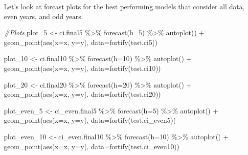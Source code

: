 \documentclass[
]{article}
\newenvironment{Shaded}{\begin{snugshade}}{\end{snugshade}}
\newcommand{\AttributeTok}[1]{\textcolor[rgb]{0.77,0.63,0.00}{#1}}
\newcommand{\CommentTok}[1]{\textcolor[rgb]{0.56,0.35,0.01}{\textit{#1}}}
\newcommand{\DecValTok}[1]{\textcolor[rgb]{0.00,0.00,0.81}{#1}}
\newcommand{\FunctionTok}[1]{\textcolor[rgb]{0.00,0.00,0.00}{#1}}
\newcommand{\NormalTok}[1]{#1}
\newcommand{\OtherTok}[1]{\textcolor[rgb]{0.56,0.35,0.01}{#1}}
\newcommand{\SpecialCharTok}[1]{\textcolor[rgb]{0.00,0.00,0.00}{#1}}
\begin{document}
Let's look at forcast plots for the best performing models that consider
all data, even years, and odd years.

\begin{Shaded}
\begin{Highlighting}[]
\CommentTok{\#Plots}
\NormalTok{plot\_5 }\OtherTok{\textless{}{-}}\NormalTok{ ci.final5 }\SpecialCharTok{\%\textgreater{}\%}
  \FunctionTok{forecast}\NormalTok{(}\AttributeTok{h=}\DecValTok{5}\NormalTok{) }\SpecialCharTok{\%\textgreater{}\%}
  \FunctionTok{autoplot}\NormalTok{() }\SpecialCharTok{+} \FunctionTok{geom\_point}\NormalTok{(}\FunctionTok{aes}\NormalTok{(}\AttributeTok{x=}\NormalTok{x, }\AttributeTok{y=}\NormalTok{y), }\AttributeTok{data=}\FunctionTok{fortify}\NormalTok{(test.ci5))}

\NormalTok{plot\_10 }\OtherTok{\textless{}{-}}\NormalTok{ ci.final10 }\SpecialCharTok{\%\textgreater{}\%}
  \FunctionTok{forecast}\NormalTok{(}\AttributeTok{h=}\DecValTok{10}\NormalTok{) }\SpecialCharTok{\%\textgreater{}\%}
  \FunctionTok{autoplot}\NormalTok{() }\SpecialCharTok{+} \FunctionTok{geom\_point}\NormalTok{(}\FunctionTok{aes}\NormalTok{(}\AttributeTok{x=}\NormalTok{x, }\AttributeTok{y=}\NormalTok{y), }\AttributeTok{data=}\FunctionTok{fortify}\NormalTok{(test.ci10))}

\NormalTok{plot\_20 }\OtherTok{\textless{}{-}}\NormalTok{ ci.final20 }\SpecialCharTok{\%\textgreater{}\%}
  \FunctionTok{forecast}\NormalTok{(}\AttributeTok{h=}\DecValTok{20}\NormalTok{) }\SpecialCharTok{\%\textgreater{}\%}
  \FunctionTok{autoplot}\NormalTok{() }\SpecialCharTok{+} \FunctionTok{geom\_point}\NormalTok{(}\FunctionTok{aes}\NormalTok{(}\AttributeTok{x=}\NormalTok{x, }\AttributeTok{y=}\NormalTok{y), }\AttributeTok{data=}\FunctionTok{fortify}\NormalTok{(test.ci20))}

\NormalTok{plot\_even\_5 }\OtherTok{\textless{}{-}}\NormalTok{ ci\_even.final5 }\SpecialCharTok{\%\textgreater{}\%}
  \FunctionTok{forecast}\NormalTok{(}\AttributeTok{h=}\DecValTok{5}\NormalTok{) }\SpecialCharTok{\%\textgreater{}\%}
  \FunctionTok{autoplot}\NormalTok{() }\SpecialCharTok{+} \FunctionTok{geom\_point}\NormalTok{(}\FunctionTok{aes}\NormalTok{(}\AttributeTok{x=}\NormalTok{x, }\AttributeTok{y=}\NormalTok{y), }\AttributeTok{data=}\FunctionTok{fortify}\NormalTok{(test.ci\_even5))}

\NormalTok{plot\_even\_10 }\OtherTok{\textless{}{-}}\NormalTok{ ci\_even.final10 }\SpecialCharTok{\%\textgreater{}\%}
  \FunctionTok{forecast}\NormalTok{(}\AttributeTok{h=}\DecValTok{10}\NormalTok{) }\SpecialCharTok{\%\textgreater{}\%}
  \FunctionTok{autoplot}\NormalTok{() }\SpecialCharTok{+} \FunctionTok{geom\_point}\NormalTok{(}\FunctionTok{aes}\NormalTok{(}\AttributeTok{x=}\NormalTok{x, }\AttributeTok{y=}\NormalTok{y), }\AttributeTok{data=}\FunctionTok{fortify}\NormalTok{(test.ci\_even10))}


\end{Highlighting}
\end{Shaded}
\end{document}
